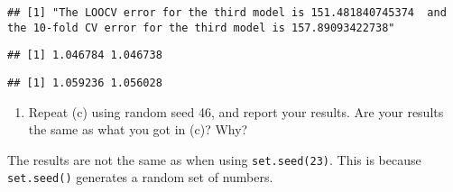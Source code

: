 \documentclass[]{article}
\newenvironment{Shaded}{\begin{snugshade}}{\end{snugshade}}
\newcommand{\KeywordTok}[1]{\textcolor[rgb]{0.13,0.29,0.53}{\textbf{#1}}}
\newcommand{\DataTypeTok}[1]{\textcolor[rgb]{0.13,0.29,0.53}{#1}}
\newcommand{\DecValTok}[1]{\textcolor[rgb]{0.00,0.00,0.81}{#1}}
\newcommand{\CommentTok}[1]{\textcolor[rgb]{0.56,0.35,0.01}{\textit{#1}}}
\newcommand{\OperatorTok}[1]{\textcolor[rgb]{0.81,0.36,0.00}{\textbf{#1}}}
\newcommand{\NormalTok}[1]{#1}
\providecommand{\tightlist}{%
  \setlength{\itemsep}{0pt}\setlength{\parskip}{0pt}}
\begin{document}
\begin{verbatim}
## [1] "The LOOCV error for the third model is 151.481840745374  and the 10-fold CV error for the third model is 157.89093422738"
\end{verbatim}

\begin{Shaded}
\end{Shaded}

\begin{verbatim}
## [1] 1.046784 1.046738
\end{verbatim}

\begin{Shaded}
\end{Shaded}

\begin{verbatim}
## [1] 1.059236 1.056028
\end{verbatim}

\begin{enumerate}
\def\labelenumi{(\alph{enumi})}
\setcounter{enumi}{3}
\tightlist
\item
  Repeat (c) using random seed 46, and report your results. Are your
  results the same as what you got in (c)? Why?
\end{enumerate}

The results are not the same as when using \texttt{set.seed(23)}. This
is because \texttt{set.seed()} generates a random set of numbers.
\end{document}
